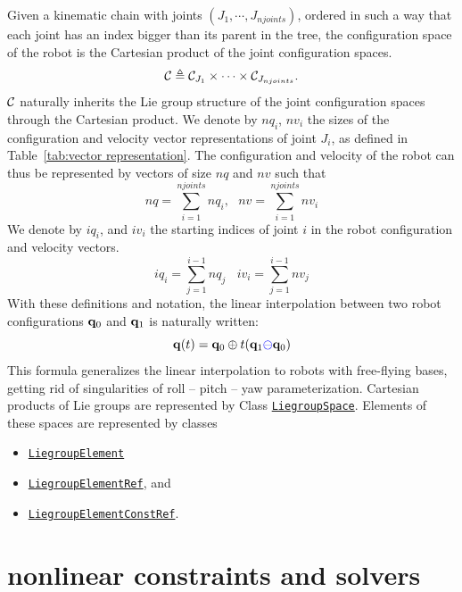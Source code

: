 Given a kinematic chain with joints $(J_1, \cdots, J_{njoints})$, ordered in such
a way that each joint has an index bigger than its parent in the tree, the configuration space of the robot is the Cartesian product of the joint configuration spaces.
$$
\mathcal{C} \triangleq \mathcal{C}_{J_1}\times \cdots \times \mathcal{C}_{J_{njoints}}.
$$
$\mathcal{C}$ naturally inherits the Lie group structure of the joint configuration spaces through the Cartesian product.
We denote by $nq_i$, $nv_i$ the sizes of the configuration and velocity vector representations of joint $J_i$, as defined in Table~\ref{tab:vector representation}.
The configuration and velocity of the robot can thus be represented by vectors of size $nq$ and $nv$ such that
$$
nq = \sum_{i=1}^{njoints} nq_i, \ \ \ nv = \sum_{i=1}^{njoints} nv_i
$$
We denote by $iq_i$, and $iv_i$ the {\color{blue}starting} indices of joint $i$ in the robot configuration and velocity vectors.
$$
iq_i = \sum_{j=1}^{i-1} nq_j\ \ \ \ iv_i = \sum_{j=1}^{i-1} nv_j
$$
With these definitions and notation, the linear interpolation between two robot
configurations $\mathbf{q}_0$ and $\mathbf{q}_1$ is naturally written:
$$
\mathbf{q}(t) = \mathbf{q}_0 \oplus t (\mathbf{q}_1 {\color{blue}\ominus} \mathbf{q}_0)
$$
This formula generalizes the linear interpolation to robots with free-flying bases, getting rid of singularities of roll -- pitch -- yaw parameterization.
Cartesian products of Lie groups are represented by Class \href{https://gepettoweb.laas.fr/hpp/hpp-pinocchio/doxygen-html/classhpp_1_1pinocchio_1_1LiegroupSpace.html}{\texttt{LiegroupSpace}}. Elements of these spaces are represented by classes
\begin{itemize}
\item \href{https://gepettoweb.laas.fr/hpp/hpp-pinocchio/doxygen-html/classhpp_1_1pinocchio_1_1LiegroupElementBase.html}{\texttt{LiegroupElement}}
\item \href{https://gepettoweb.laas.fr/hpp/hpp-pinocchio/doxygen-html/classhpp_1_1pinocchio_1_1LiegroupElementBase.html}{\texttt{LiegroupElementRef}}, and
\item \href{https://gepettoweb.laas.fr/hpp/hpp-pinocchio/doxygen-html/classhpp_1_1pinocchio_1_1LiegroupElementBase.html}{\texttt{LiegroupElementConstRef}}.
  \end{itemize}

\section{nonlinear constraints and solvers}\label{sec:constraints}

